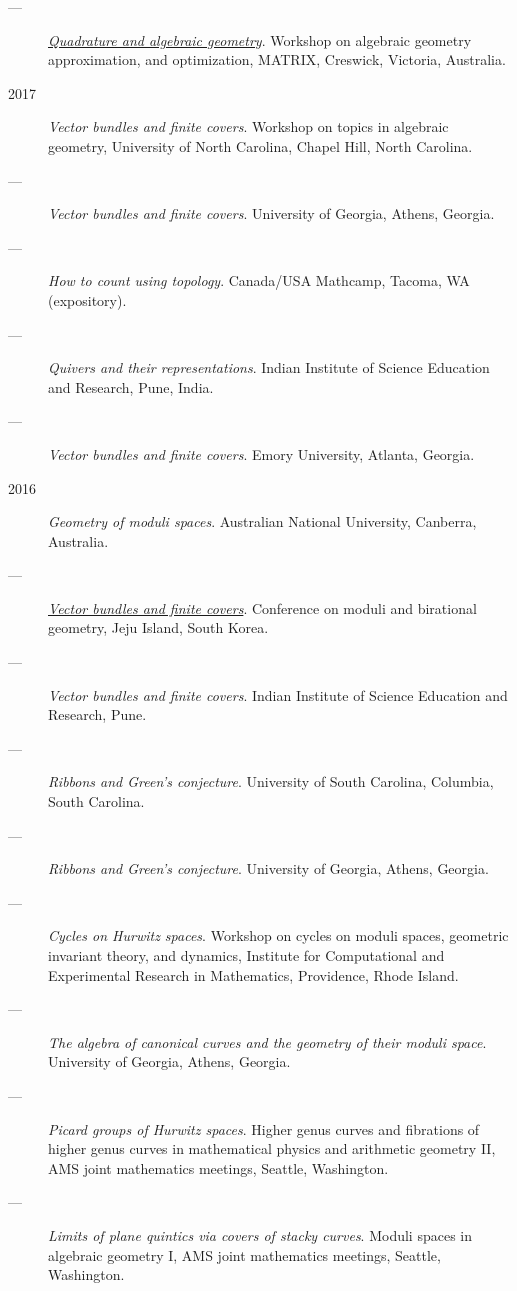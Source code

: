 \documentclass[11pt]{article}
\begin{document}
\begin{description}
\item[{---}] \emph{\href{talks/MATRIX2018.pdf}{Quadrature and algebraic geometry}}. Workshop on algebraic geometry approximation, and optimization, MATRIX, Creswick, Victoria, Australia.
\item[{2017}] \emph{Vector bundles and finite covers}. Workshop on topics in algebraic geometry, University of North Carolina, Chapel Hill, North Carolina.
\item[{---}] \emph{Vector bundles and finite covers}. University of Georgia, Athens, Georgia.
\item[{---}] \emph{How to count using topology}. Canada/USA Mathcamp, Tacoma, WA (expository).
\item[{---}] \emph{Quivers and their representations}. Indian Institute of Science Education and Research, Pune, India.
\item[{---}] \emph{Vector bundles and finite covers}. Emory University, Atlanta, Georgia.
\item[{2016}] \emph{Geometry of moduli spaces}. Australian National University, Canberra, Australia.
\item[{---}] \emph{\href{talks/Jeju2016.pdf}{Vector bundles and finite covers}}. Conference on moduli and birational geometry, Jeju Island, South Korea.
\item[{---}] \emph{Vector bundles and finite covers}. Indian Institute of Science Education and Research, Pune.
\item[{---}] \emph{Ribbons and Green's conjecture}. University of South Carolina, Columbia, South Carolina.
\item[{---}] \emph{Ribbons and Green's conjecture}. University of Georgia, Athens, Georgia.
\item[{---}] \emph{Cycles on Hurwitz spaces}. Workshop on cycles on moduli spaces, geometric invariant theory, and dynamics, Institute for Computational and Experimental Research in Mathematics, Providence, Rhode Island.
\item[{---}] \emph{The algebra of canonical curves and the geometry of their moduli space}. University of Georgia, Athens, Georgia.
\item[{---}] \emph{Picard groups of Hurwitz spaces}. Higher genus curves and fibrations of higher genus curves in mathematical physics and arithmetic geometry II, AMS joint mathematics meetings, Seattle, Washington.
\item[{---}] \emph{Limits of plane quintics via covers of stacky curves}. Moduli spaces in algebraic geometry I, AMS joint mathematics meetings, Seattle, Washington.

\end{description}
\end{document}
